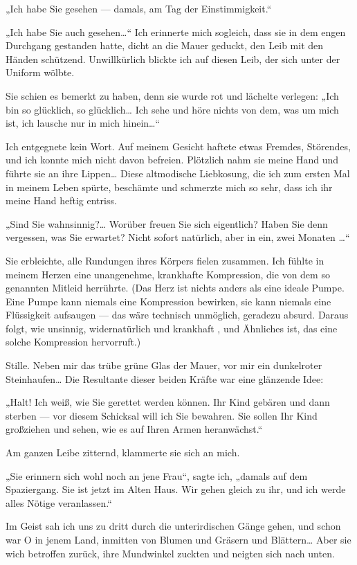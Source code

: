 „Ich habe Sie gesehen — damals, am Tag der Einstimmigkeit.“

„Ich habe Sie auch gesehen\ldots{}“ Ich erinnerte mich sogleich, dass
sie in dem engen Durchgang gestanden hatte, dicht an die Mauer
geduckt, den Leib mit den Händen
schützend. Unwillkürlich blickte ich auf diesen Leib, der sich
unter der Uniform wölbte.

Sie schien es bemerkt zu haben, denn sie
wurde rot und lächelte verlegen: „Ich bin so glücklich, so
glücklich\ldots{} Ich sehe und höre nichts von dem, was um mich ist, ich
lausche nur in mich hinein\ldots{}“

Ich entgegnete kein Wort. Auf meinem Gesicht haftete etwas Fremdes,
Störendes, und ich konnte mich nicht davon befreien. Plötzlich nahm
sie meine Hand und führte sie an ihre Lippen\ldots{} Diese altmodische
Liebkosung, die ich zum ersten Mal in meinem Leben spürte,
beschämte und schmerzte mich so sehr, dass ich ihr meine Hand
heftig entriss.

„Sind Sie wahnsinnig?\ldots{} Worüber freuen Sie sich eigentlich? Haben
Sie denn vergessen, was Sie erwartet? Nicht sofort natürlich, aber
in ein, zwei Monaten \ldots{}“

Sie erbleichte, alle Rundungen ihres
Körpers fielen zusammen. Ich fühlte in meinem Herzen eine
unangenehme, krankhafte Kompression, die von dem so genannten
Mitleid herrührte. (Das Herz ist nichts anders als eine ideale
Pumpe. Eine Pumpe kann niemals eine Kompression bewirken, sie kann
niemals eine Flüssigkeit aufsaugen — das wäre technisch unmöglich,
geradezu absurd. Daraus folgt, wie unsinnig, widernatürlich und
krankhaft ,  und Ähnliches ist, das eine solche
Kompression hervorruft.)

Stille. Neben mir das trübe grüne Glas der Mauer, vor mir ein
dunkelroter Steinhaufen\ldots{} Die Resultante dieser beiden Kräfte war
eine glänzende Idee:

„Halt! Ich weiß, wie Sie gerettet werden
können. Ihr Kind gebären und dann sterben — vor diesem Schicksal
will ich Sie bewahren. Sie sollen Ihr Kind großziehen und sehen,
wie es auf Ihren Armen heranwächst.“

Am ganzen Leibe zitternd, klammerte sie sich an mich.

„Sie erinnern sich wohl noch an jene Frau“, sagte ich, „damals auf
dem Spaziergang. Sie ist jetzt im Alten
Haus. Wir gehen gleich zu ihr, und ich werde alles Nötige
veranlassen.“

Im Geist sah ich uns zu dritt durch die unterirdischen Gänge gehen,
und schon war O in jenem Land, inmitten von Blumen und Gräsern und
Blättern\ldots{} Aber sie wich betroffen zurück, ihre Mundwinkel zuckten
und neigten sich nach unten.

